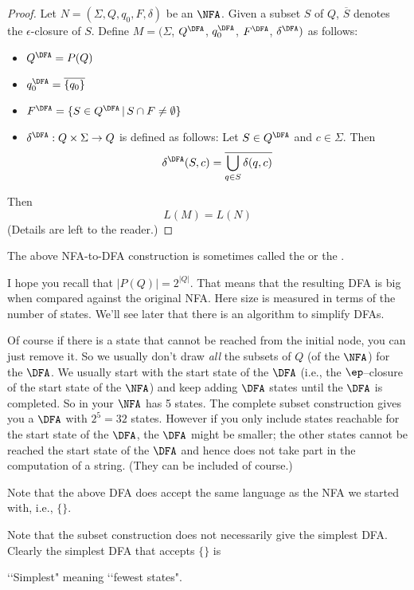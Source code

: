 \begin{proof}
Let $N = (\Sigma, Q, q_0, F, \delta)$ be an $\NFA$. 
Given a subset $S$ of $Q$, $\overline{S}$ denotes the $\epsilon$-closure
of $S$.
Define $M =
(\Sigma$, $Q^{\DFA}$, $q_0^{\DFA}$, $F^{\DFA}$, $\delta^{\DFA})$ as
follows: 
 \begin{itemize}
 \item $Q^{\DFA} = P(Q)$
 \item $q_0^{\DFA} = \overline{\{q_0\}}$
 \item $F^{\DFA} = \{ S \in Q^{\DFA} \,|\, S \cap F \neq \emptyset \}$
 \item $\delta^{\DFA} : Q \times \Sigma \rightarrow Q$ is defined as
 follows: Let $S \in Q^{\DFA}$ and $c \in \Sigma$. Then
 \[
   \delta^{\DFA}(S,c) = \overline{\bigcup_{q \in S} \delta(q,c)}
 \]
 \end{itemize}
Then 
\[
L(M) = L(N)
\]
(Details are left to the reader.)
\end{proof}

The above NFA-to-DFA construction is sometimes called the
 or the
\tinysidebarskip{}\sidebarskip{0pt}.


I hope you recall that $|P(Q)| = 2^{|Q|}$. 
That means that the
resulting DFA is big when compared against the original NFA. 
Here size is measured in terms of the
number of states. We'll see later that there is an algorithm to
simplify DFAs.

Of course if there is a state that cannot be reached from the initial
node, you can just remove it. 
So we usually don't draw \textit{all} the subsets of $Q$ (of the $\NFA$)
for the $\DFA$. 
We usually start with the start state of the $\DFA$ 
(i.e., the $\ep$--closure of the start state of the $\NFA$)
and keep adding $\DFA$ states until the $\DFA$ is completed.
So in your $\NFA$ has 5 states.
The complete subset construction gives you a $\DFA$ with $2^5 = 32$ states.
However if you only include states reachable for the start state
of the $\DFA$, the $\DFA$ might be smaller;
the other states cannot be reached the start state of the $\DFA$
and hence does not take part in the computation of a string.
(They can be included of course.)



Note that the above DFA does accept the same language as the 
NFA we started with, i.e., $\{\}$.

Note that the subset construction does not
necessarily give the simplest DFA.
Clearly the simplest DFA that accepts $\{\}$ is

\lq\lq Simplest" meaning \lq\lq fewest states".


\vspace{3in}






